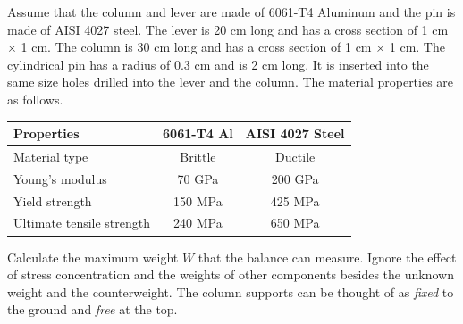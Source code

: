 \documentclass[
10pt,
a4paper,
openany,
svgnames,
]{book}
\begin{document}
\begin{figure}[h]
  \centering
\end{figure}

Assume that the column and lever are made of 6061-T4 Aluminum and the pin is made of AISI 4027 steel. The lever is 20 cm long and has a cross section of 1 cm $\times$ 1 cm. The column is 30 cm long and has a cross section of 1 cm $\times$ 1 cm. The cylindrical pin has a radius of 0.3 cm and is 2 cm long. It is inserted into the same size holes drilled into the lever and the column. The material properties are as follows.
\begin{table}[h]
  \centering
    \begin{tabular}{ lcc }
      \toprule
      Properties & 6061-T4 Al & AISI 4027 Steel \\
      \midrule
      Material type & Brittle & Ductile \\
      Young’s modulus & 70 GPa & 200 GPa \\
      Yield strength & 150 MPa & 425 MPa \\
      Ultimate tensile strength & 240 MPa & 650 MPa \\
      \bottomrule
  \end{tabular}
\end{table}

Calculate the maximum weight $W$ that the balance can measure. Ignore the effect of stress concentration and the weights of other components besides the unknown weight and the counterweight. The column supports can be thought of as \emph{fixed} to the ground and \emph{free} at the top.
\end{document}
